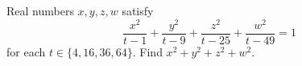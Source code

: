 Real numbers $x,y,z,w$ satisfy
\[\dfrac{x^2}{t-1}+\dfrac{y^2}{t-9}+\dfrac{z^2}{t-25}+\dfrac{w^2}{t-49}=1\]
for each $t\in\{4,16,36,64\}$. Find $x^2+y^2+z^2+w^2$.
